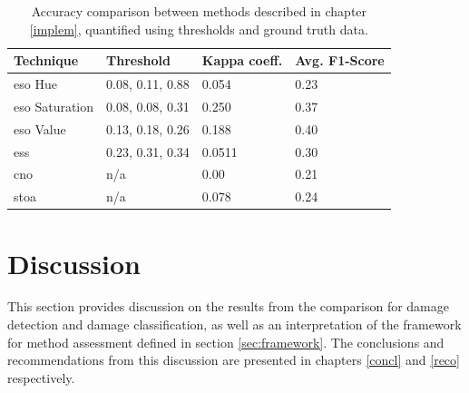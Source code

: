 \begin{table} [H]
	\centering
	\footnotesize
	\captionsetup{justification=raggedright,singlelinecheck=false}
	\caption{\footnotesize{Accuracy comparison between methods described in chapter \ref{implem}, quantified using thresholds and ground truth data.}}	
	\begin{tabular}{llll}
		\toprule
		Technique & Threshold & Kappa coeff. & Avg. F1-Score \\
		\midrule			
		\ac{eso} Hue & 0.08, 0.11, 0.88 & 0.054 & 0.23\\
		\ac{eso} Saturation & 0.08, 0.08, 0.31 & 0.250 & 0.37\\
		\ac{eso} Value & 0.13, 0.18, 0.26 & 0.188 & 0.40\\
		\ac{ess} & 0.23, 0.31, 0.34 & 0.0511 & 0.30\\
		\midrule
		\ac{cno} & n/a & 0.00 & 0.21\\
		\midrule
		\ac{stoa} & n/a & 0.078 & 0.24\\
		\bottomrule
	\end{tabular}
	\label{tab:extended}
\end{table} 

\section{Discussion} \label{sec:disc}
This section provides discussion on the results from the comparison for damage detection and damage classification, as well as an interpretation of the framework for method assessment defined in section \ref{sec:framework}. The conclusions and recommendations from this discussion are presented in chapters \ref{concl} and \ref{reco} respectively.\\

